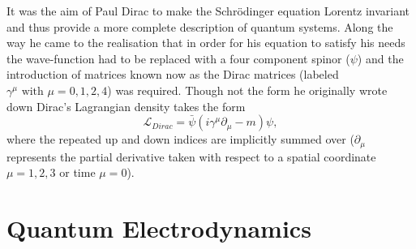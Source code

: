 It was the aim of Paul Dirac to make the Schr\"odinger equation Lorentz
invariant and thus provide a more complete description of quantum systems. Along
the way he came to the realisation that in order for his equation to satisfy his
needs the wave-function had to be replaced with a four component spinor ($\psi$)
and the introduction of matrices known now as the Dirac matrices (labeled
$\gamma^{\mu} \text{ with } \mu=0,1,2,4$) was required. Though not the form he
originally wrote down Dirac's Lagrangian density takes the form
  \begin{equation}
    \label{eq:dirac}
    \mathcal{L}_{Dirac} = \bar{\psi}(i\gamma^{\mu}\partial_{\mu} - m)\psi,
  \end{equation}
where the repeated up and down indices are implicitly summed over
($\partial_{\mu}$ represents the partial derivative taken with respect to a
spatial coordinate $\mu = 1,2,3$ or time $\mu = 0$).

\section{Quantum Electrodynamics}

